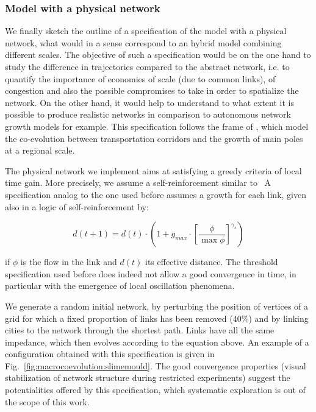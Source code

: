 \subsubsection{Model with a physical network}


We finally sketch the outline of a specification of the model with a physical network, what would in a sense correspond to an hybrid model combining different scales. The objective of such a specification would be on the one hand to study the difference in trajectories compared to the abstract network, i.e. to quantify the importance of economies of scale (due to common links), of congestion and also the possible compromises to take in order to spatialize the network. On the other hand, it would help to understand to what extent it is possible to produce realistic networks in comparison to autonomous network growth models  for example. This specification follows the frame of \cite{li2014modeling}, which model the co-evolution between transportation corridors and the growth of main poles at a regional scale. 



The physical network we implement aims at satisfying a greedy criteria of local time gain. More precisely, we assume a self-reinforcement similar to~\cite{tero2010rules} A specification analog to the one used before assumes a growth for each link, given also in a logic of self-reinforcement by:

\[
d(t+1) = d(t)\cdot \left(1 + g_{max} \cdot \left[\frac{\phi}{\max \phi}\right]^{\gamma_s}\right)
\]

if $\phi$ is the flow in the link and $d(t)$ its effective distance. The threshold specification used before does indeed not allow a good convergence in time, in particular with the emergence of local oscillation phenomena.

We generate a random initial network, by perturbing the position of vertices of a grid for which a fixed proportion of links has been removed (40\%) and by linking cities to the network through the shortest path. Links have all the same impedance, which then evolves according to the equation above. An example of a configuration obtained with this specification is given in Fig.~\ref{fig:macrocoevolution:slimemould}. The good convergence properties (visual stabilization of network structure during restricted experiments) suggest the potentialities offered by this specification, which systematic exploration is out of the scope of this work.


